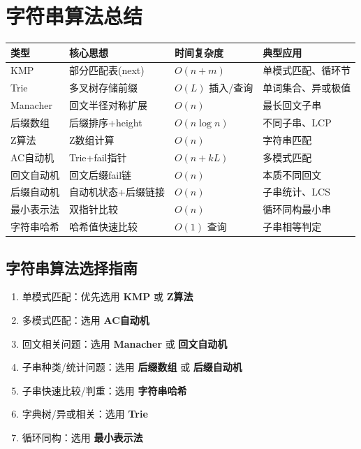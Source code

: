 \documentclass[12pt,a4paper]{ctexart}
\begin{document}
		\newpage
		
		\section{字符串算法总结}
		\begin{table}[h]
			\centering
			\begin{tabularx}{\textwidth}{|l|p{4cm}|l|X|}
				\hline
				类型 & 核心思想 & 时间复杂度 & 典型应用 \\
				\hline
				KMP & 部分匹配表(next) & \(O(n+m)\) & 单模式匹配、循环节 \\
				\hline
				Trie & 多叉树存储前缀 & \(O(L)\) 插入/查询 & 单词集合、异或极值 \\
				\hline
				Manacher & 回文半径对称扩展 & \(O(n)\) & 最长回文子串 \\
				\hline
				后缀数组 & 后缀排序+height & \(O(n\log n)\) & 不同子串、LCP \\
				\hline
				Z算法 & Z数组计算 & \(O(n)\) & 字符串匹配 \\
				\hline
				AC自动机 & Trie+fail指针 & \(O(n+kL)\) & 多模式匹配 \\
				\hline
				回文自动机 & 回文后缀fail链 & \(O(n)\) & 本质不同回文 \\
				\hline
				后缀自动机 & 自动机状态+后缀链接 & \(O(n)\) & 子串统计、LCS \\
				\hline
				最小表示法 & 双指针比较 & \(O(n)\) & 循环同构最小串 \\
				\hline
				字符串哈希 & 哈希值快速比较 & \(O(1)\) 查询 & 子串相等判定 \\
				\hline
			\end{tabularx}
		\end{table}
		
		\subsection*{字符串算法选择指南}
		\begin{enumerate}
			\item 单模式匹配：优先选用 \textbf{KMP} 或 \textbf{Z算法}
			\item 多模式匹配：选用 \textbf{AC自动机}
			\item 回文相关问题：选用 \textbf{Manacher} 或 \textbf{回文自动机}
			\item 子串种类/统计问题：选用 \textbf{后缀数组} 或 \textbf{后缀自动机}
			\item 子串快速比较/判重：选用 \textbf{字符串哈希}
			\item 字典树/异或相关：选用 \textbf{Trie}
			\item 循环同构：选用 \textbf{最小表示法}
		\end{enumerate}
		
\end{document}
